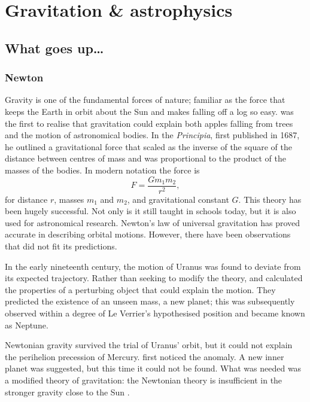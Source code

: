 \chapter{Gravitation \& astrophysics}

\section{What goes up\ldots}

\subsection{Newton}

Gravity is one of the fundamental forces of nature; familiar as the force that keeps the Earth in orbit about the Sun and makes falling off a log so easy. \citet[book 3]{Newton1999} was the first to realise that gravitation could explain both apples falling from trees and the motion of astronomical bodies. In the \textit{Principia}, first published in 1687, he outlined a gravitational force that scaled as the inverse of the square of the distance between centres of mass and was proportional to the product of the masses of the bodies. In modern notation the force is
\begin{equation}
F = \frac{G m_1 m_2}{r^2},
\end{equation}
for distance $r$, masses $m_1$ and $m_2$, and gravitational constant $G$. This theory has been hugely successful. Not only is it still taught in schools today, but it is also used for astronomical research. Newton's law of universal gravitation has proved accurate in describing orbital motions. However, there have been observations that did not fit its predictions.

In the early nineteenth century, the motion of Uranus was found to deviate from its expected trajectory. Rather than seeking to modify the theory, \citet[\textit{troisi{\`e}me partie}]{LeVerrier1846} and \citet[papers 1 and 2]{Adams1896} calculated the properties of a perturbing object that could explain the motion. They predicted the existence of an unseen mass, a new planet; this was subsequently observed within a degree of Le Verrier's hypothesised position \citep[\textit{cinqui{\`e}me partie}]{LeVerrier1846} and became known as Neptune.

Newtonian gravity survived the trial of Uranus' orbit, but it could not explain the perihelion precession of Mercury. \citet[\textit{chapitre XV}, \textit{section quatri{\`e}me}]{LeVerrier1859} first noticed the anomaly. A new inner planet was suggested, but this time it could not be found. What was needed was a modified theory of gravitation: the Newtonian theory is insufficient in the stronger gravity close to the Sun \citep[document 24]{Einstein1997}.

